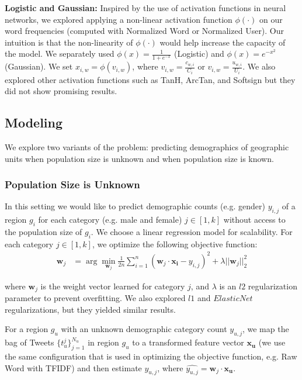 \documentclass[letterpaper]{article}
\begin{document}
\textbf{Logistic and Gaussian:} Inspired by the use of activation functions in neural networks, we explored applying a non-linear activation function $\phi(\cdot)$ on our word frequencies (computed with Normalized Word or Normalized User). Our intuition is that the non-linearity of $\phi(\cdot)$ would help increase the capacity of the model. We separately used $\phi(x) = \frac{1}{1 + e^{-x}}$ (Logistic) and $\phi(x) = e^{-{x}^2}$ (Gaussian). We set $x_{i,w} = \phi(v_{i,w})$, where $v_{i,w} = \frac{c_{w,i}}{C_i}$ or $v_{i,w} = \frac{u_{w,i}}{U_i}$. We also explored other activation functions such as TanH, ArcTan, and Softsign but they did not show promising results.

\subsection{Modeling}
We explore two variants of the problem: predicting demographics of geographic units when population size is unknown and when population size is known.

\subsubsection{Population Size is Unknown} In this setting we would like to predict demographic counts (e.g. gender) $y_{i,j}$ of a region $g_i$ for each category (e.g. male and female) $j \in [1, k]$ without access to the population size of $g_i$. We choose a linear regression model for scalability. For each category $j \in [1,k]$, we optimize the following objective function:
\begin{align*}
    \mathbf{w}_j &= \arg\min\limits_{\mathbf{w}_j} \frac{1}{2n} \sum_{i=1}^{n} (\mathbf{w}_j\cdot\mathbf{x_i} - y_{i,j})^2 + \lambda||\mathbf{w}_j||_2^2
\end{align*}

where $\mathbf{w}_j$ is the weight vector learned for category $j$, and $\lambda$ is an $l2$ regularization parameter to prevent overfitting. We also explored $l1$ and $ElasticNet$ regularizations, but they yielded similar results.

For a region $g_u$ with an unknown demographic category count $y_{u,j}$, we map the bag of Tweets $\{t_u^j\}_{j=1}^{N_u}$ in region $g_u$ to a transformed feature vector $\mathbf{x_u}$ (we use the same configuration that is used in optimizing the objective function, e.g. Raw Word with TFIDF) and then estimate $y_{u,j}$, where $\hat{y_{u,j}} = \mathbf{w}_j\cdot\mathbf{x_u}$.
\end{document}
